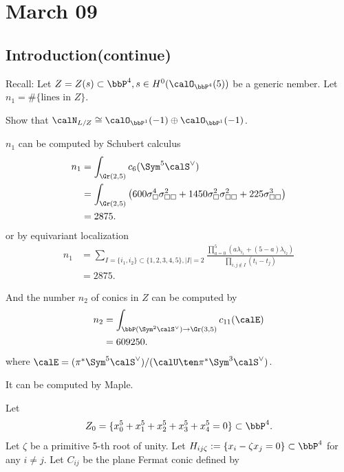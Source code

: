 \section{March 09}

\subsection{Introduction(continue)}


    Recall: Let \(Z = Z(s) \subset \bbP^4, s \in H^0(\calO_{\bbP^4}(5))\) be a generic nember.
    Let \(n_1 = \#\{\text{lines in } Z\}\).

    \begin{exercise}
        Show that \(\calN_{L/Z} \cong \calO_{\bbP^1}(-1) \oplus \calO_{\bbP^1}(-1)\).
    \end{exercise}

    \(n_1\) can be computed by 
    Schubert calculus
    \begin{align*}
        n_1 &= \int_{\Gr(2,5)} c_6(\Sym^5 \calS^\vee) \\
            &= \int_{\Gr(2,5)} \left( 600 \sigma^4_\square \sigma^2_{\square\square} + 1450 \sigma^2_{\square} \sigma^2_{\square\square} + 225 \sigma_{\square\square}^3 \right) \\
            &= 2875.
    \end{align*}
    or by equivariant localization
    \begin{align*}
        n_1 &= \sum_{I=\{i_1,i_2\} \subset \{1,2,3,4,5\}, |I|=2} \frac{\prod_{a = 0}^5 (a\lambda_{i_1} + (5-a)\lambda_{i_2})}{ \prod_{i,j \notin I} (t_i - t_j)} \\
            &= 2875.
    \end{align*}

    And the number \(n_2\) of conics in \(Z\) can be computed by
    \begin{align*}
        n_2 &= \int_{\bbP(\Sym^2 \calS^\vee) \to \Gr(3,5)} c_{11}(\calE) \\
            &= 609250.
    \end{align*}
    where \(\calE = (\pi^* \Sym^5 \calS^\vee)/ (\calU \ten \pi^*\Sym^3 \calS^\vee)\).

    It can be computed by Maple.

    Let 
    \[ Z_0 = \{x_0^5 + x_1^5 + x_2^5 + x_3^5 + x_4^5 = 0\} \subset \bbP^4. \]
    Let \(\zeta\) be a primitive 5-th root of unity.
    Let $H_{ij\zeta} := \{x_i - \zeta x_j = 0\} \subset \bbP^4$ for any \(i \neq j\).
    Let $C_{ij}$ be the plane Fermat conic defined by 

